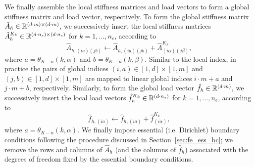 We finally assemble the local stiffness matrices and load vectors to form a global stiffness matrix and load vector, respectively.  To form the global stiffness matrix $\hat A_h \in \mathbb{R}^{(d\cdot m) \times (d \cdot m)}$, we successively insert the local stiffness matrices $\hat A^{K_k}_h \in \mathbb{R}^{(d \cdot n_s) \times (d \cdot n_s)}$ for $k = 1,\dots,n_e$, according to
\begin{equation*}
  \hat A_{h,(ia)(jb)} \leftarrow \hat A_{h,(ia)(jb)} + \hat A^{K_k}_{(i\alpha)(j\beta)}, 
\end{equation*}
where $a = \theta_{K-n}(k,\alpha)$ and $b = \theta_{K-n}(k,\beta)$.  Similar to the local index, in practice the pairs of global indices $(i,a) \in [1,d] \times [1,m]$ and $(j,b) \in [1,d] \times [1,m]$ are mapped to linear global indices $i \cdot m + a$ and $j \cdot m + b$, respectively.  Similarly, to form the global load vector $\hat f_h \in \mathbb{R}^{(d\cdot m)}$, we successively insert the local load vectors $\hat f^{K_k}_h \in \mathbb{R}^{(d \cdot n_s)}$ for $k = 1,\dots,n_e$, according to
\begin{equation*}
  \hat f_{h,(ia)} \leftarrow \hat f_{h,(ia)} + \hat f^{K_k}_{(i\alpha)}, 
\end{equation*}
where $a = \theta_{K-n}(k,\alpha)$. We finally impose essential (i.e. Dirichlet) boundary conditions following the procedure discussed in Section~\ref{sec:fe_ess_bc}; we remove the rows and columns of $\hat A_h$ (and the columns of $\hat f_h$) associated with the degrees of freedom fixed by the essential boundary conditions.

